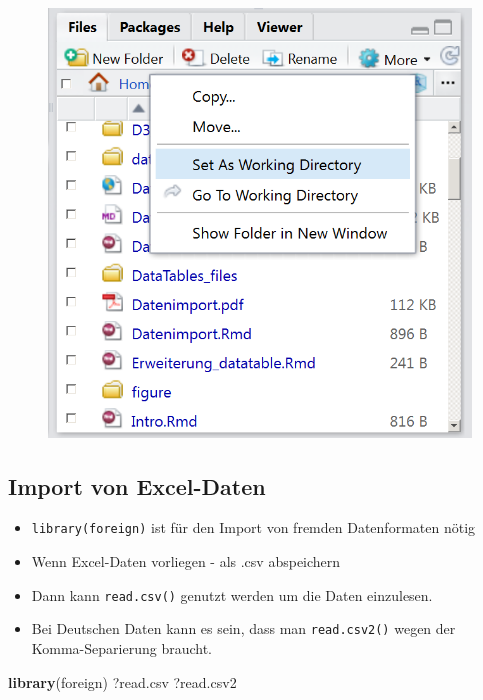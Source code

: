 \documentclass[]{article}
\newenvironment{Shaded}{\begin{snugshade}}{\end{snugshade}}
\newcommand{\KeywordTok}[1]{\textcolor[rgb]{0.13,0.29,0.53}{\textbf{{#1}}}}
\newcommand{\NormalTok}[1]{{#1}}
\providecommand{\tightlist}{%
  \setlength{\itemsep}{0pt}\setlength{\parskip}{0pt}}
\begin{document}
\begin{figure}[htbp]
\centering
\includegraphics{figure/SetWD.PNG}
\caption{}
\end{figure}

\subsection{Import von Excel-Daten}\label{import-von-excel-daten}

\begin{itemize}
\tightlist
\item
  \texttt{library(foreign)} ist für den Import von fremden Datenformaten
  nötig
\item
  Wenn Excel-Daten vorliegen - als .csv abspeichern
\item
  Dann kann \texttt{read.csv()} genutzt werden um die Daten einzulesen.
\item
  Bei Deutschen Daten kann es sein, dass man \texttt{read.csv2()} wegen
  der Komma-Separierung braucht.
\end{itemize}

\begin{Shaded}
\begin{Highlighting}[]
\KeywordTok{library}\NormalTok{(foreign)}
\NormalTok{?read.csv}
\NormalTok{?read.csv2}
\end{Highlighting}
\end{Shaded}
\end{document}
